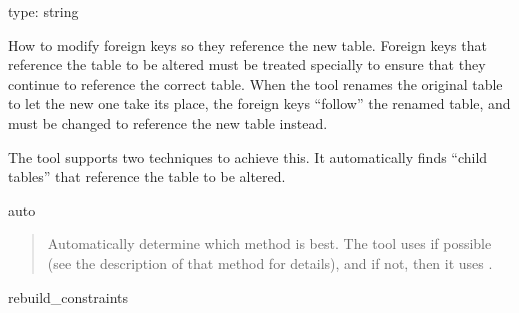\documentclass[letterpaper,10pt,english]{sphinxmanual}
\begin{document}

\begin{fulllineitems}
\label{\detokenize{mariadb-schema-change:cmdoption-mariadb-schema-change-alter-foreign-keys-method}}
\sphinxAtStartPar
type: string

\sphinxAtStartPar
How to modify foreign keys so they reference the new table.  Foreign keys that
reference the table to be altered must be treated specially to ensure that they
continue to reference the correct table. When the tool renames the original
table to let the new one take its place, the foreign keys “follow” the renamed
table, and must be changed to reference the new table instead.

\sphinxAtStartPar
The tool supports two techniques to achieve this. It automatically finds “child
tables” that reference the table to be altered.

\sphinxAtStartPar
auto
\begin{quote}

\sphinxAtStartPar
Automatically determine which method is best.  The tool uses
 if possible (see the description of that method for
details), and if not, then it uses .
\end{quote}

\sphinxAtStartPar
rebuild\_constraints
\begin{quote}


\end{quote}
\end{fulllineitems}
\end{document}
